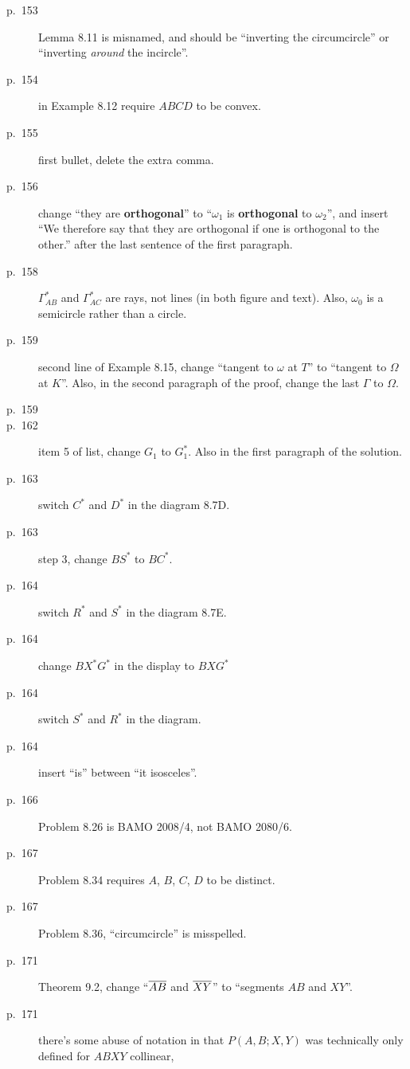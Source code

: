 \documentclass[11pt]{scrartcl}
\begin{document}
\begin{description}
\item[p.\  153] Lemma 8.11 is misnamed, and should be ``inverting the circumcircle''
  or ``inverting \emph{around} the incircle''.
\item[p.\  154] in Example 8.12 require $ABCD$ to be convex.
\item[p.\  155] first bullet, delete the extra comma.
\item[p.\  156] change ``they are \textbf{orthogonal}'' to ``$\omega_1$ is \textbf{orthogonal} to $\omega_2$'',
  and insert ``We therefore say that they are orthogonal if one is orthogonal to the other.'' after the last sentence of the first paragraph.
\item[p.\  158] $\Gamma_{AB}^\ast$ and $\Gamma_{AC}^\ast$ are rays, not lines (in both figure and text).
  Also, $\omega_0$ is a semicircle rather than a circle.
\item[p.\  159] second line of Example 8.15,
  change ``tangent to $\omega$ at $T$'' to ``tangent to $\Omega$ at $K$''.
  Also, in the second paragraph of the proof, change the last $\Gamma$ to $\Omega$.
\item[p.\  159] 
\item[p.\  162] item 5 of list, change $G_1$ to $G_1^\ast$.
  Also in the first paragraph of the solution.
\item[p.\  163] switch $C^\ast$ and $D^\ast$ in the diagram 8.7D.
\item[p.\  163] step 3, change $BS^\ast$ to $BC^\ast$.
\item[p.\  164] switch $R^\ast$ and $S^\ast$ in the diagram 8.7E.
\item[p.\  164] change $BX^\ast G^\ast$ in the display to $BXG^\ast$
\item[p.\  164] switch $S^\ast$ and $R^\ast$ in the diagram.
\item[p.\  164] insert ``is'' between ``it isosceles''.
\item[p.\  166] Problem 8.26 is BAMO 2008/4, not BAMO 2080/6.
\item[p.\  167] Problem 8.34 requires $A$, $B$, $C$, $D$ to be distinct.
\item[p.\  167] Problem 8.36, ``circumcircle'' is misspelled.
\item[p.\  171] Theorem 9.2, change ``$\overline{AB}$ and $\overline{XY}$'' to ``segments $AB$ and $XY$''.
\item[p.\  171] there's some abuse of notation in that $P(A,B;X,Y)$
  was technically only defined for $ABXY$ collinear,

\end{description}
\end{document}
